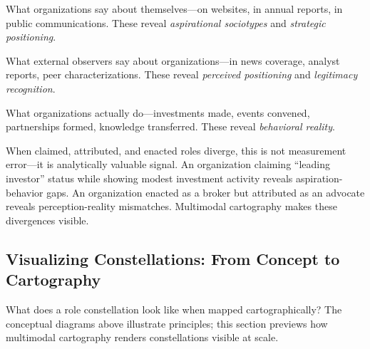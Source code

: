 \documentclass[../main.tex]{subfiles}
\begin{document}
\begin{description}[leftmargin=0.5cm, itemsep=0.3em]
\item[Claimed roles] What organizations say about themselves---on websites, in annual reports, in public communications. These reveal \emph{aspirational sociotypes} and \emph{strategic positioning}.

\item[Attributed roles] What external observers say about organizations---in news coverage, analyst reports, peer characterizations. These reveal \emph{perceived positioning} and \emph{legitimacy recognition}.

\item[Enacted roles] What organizations actually do---investments made, events convened, partnerships formed, knowledge transferred. These reveal \emph{behavioral reality}.
\end{description}

\begin{criticalbox}
When claimed, attributed, and enacted roles diverge, this is not measurement error---it is analytically valuable signal. An organization claiming ``leading investor'' status while showing modest investment activity reveals aspiration-behavior gaps. An organization enacted as a broker but attributed as an advocate reveals perception-reality mismatches. Multimodal cartography makes these divergences visible.
\end{criticalbox}

\subsection{Visualizing Constellations: From Concept to Cartography}

What does a role constellation look like when mapped cartographically? The conceptual diagrams above illustrate principles; this section previews how multimodal cartography renders constellations visible at scale.
\end{document}

